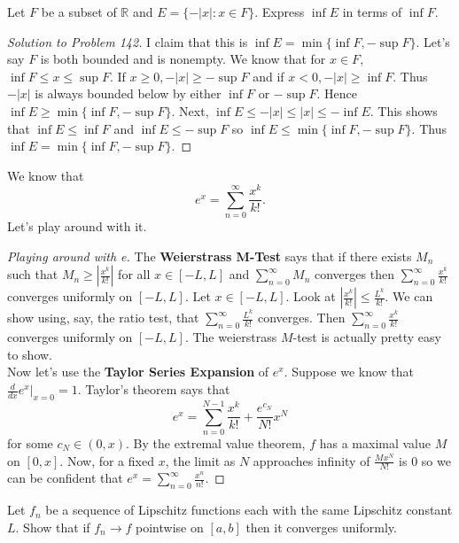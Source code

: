 \documentclass{article}
\newcommand{\vocab}[1]{\textbf{\color{blue!90}\boldmath #1}}
\newcommand{\R}{\mathbb{R}}
\newcommand{\ra}[1][]{\xrightarrow{#1}}
\begin{document}
\begin{problem}
  Let $F$ be a subset of $\R$ and $E=\{-|x|:x\in F\}$. Express $\inf E$ in terms of $\inf F$.
\end{problem}
\begin{proof}[Solution to Problem 142]
  I claim that this is $\inf E = \min\{\inf F,-\sup F\}$. Let's say $F$ is both bounded and is nonempty. We know that for $x\in F$, $\inf F\leq x\leq \sup F$. If $x\geq 0,-|x|\geq -\sup F$ and if $x<0,-|x|\geq \inf F$. Thus $-|x|$ is always bounded below by either $\inf F$ or $-\sup F$. Hence $\inf E\geq \min\{\inf F,-\sup F\}$.
  Next, $\inf E\leq -|x|\leq |x|\leq -\inf E$. This shows that $\inf E\leq \inf F$ and $\inf E\leq -\sup F$ so $\inf E\leq \min\{\inf F,-\sup F\}$. Thus $\inf E=\min\{\inf F,-\sup F\}$.
\end{proof}
\begin{problem}
  We know that $$e^x=\sum_{n=0}^\infty\frac{x^k}{k!}.$$ Let's play around with it.
\end{problem}
\begin{proof}[Playing around with e]
  The \vocab{Weierstrass M-Test} says that if there exists $M_n$ such that $M_n\geq |\frac{x^k}{k!}|$ for all $x\in[-L,L]$ and $\sum_{n=0}^\infty M_n$ converges then $\sum_{n=0}^\infty \frac{x^k}{k!}$ converges uniformly on $[-L,L]$. Let $x\in[-L,L]$.
  Look at $|\frac{x^k}{k!}|\leq \frac{L^k}{k!}$. We can show using, say, the ratio test, that $\sum_{n=0}^\infty\frac{L^k}{k!}$ converges. Then $\sum_{n=0}^\infty \frac{x^k}{k!}$ converges uniformly on $[-L,L]$. The weierstrass $M$-test is actually pretty easy to show.\\
  Now let's use the \vocab{Taylor Series Expansion} of $e^x$. Suppose we know that $\frac{d}{dx}e^x|_{x=0}=1$. Taylor's theorem says that
  $$e^x=\sum_{n=0}^{N-1}\frac{x^k}{k!}+\frac{e^{c_N}}{N!}x^N$$ for some $c_N\in(0,x)$. By the extremal value theorem, $f$ has a maximal value $M$ on $[0,x]$. Now, for a fixed $x$, the limit as $N$ approaches infinity of $\frac{Mx^N}{N!}$ is 0 so we can be confident that $e^x=\sum_{n=0}^\infty \frac{x^n}{n!}$.
\end{proof}
\begin{problem}
  Let $f_n$ be a sequence of Lipschitz functions each with the same Lipschitz constant $L$. Show that if $f_n\ra f$ pointwise on $[a,b]$ then it converges uniformly.
\end{problem}
\end{document}
